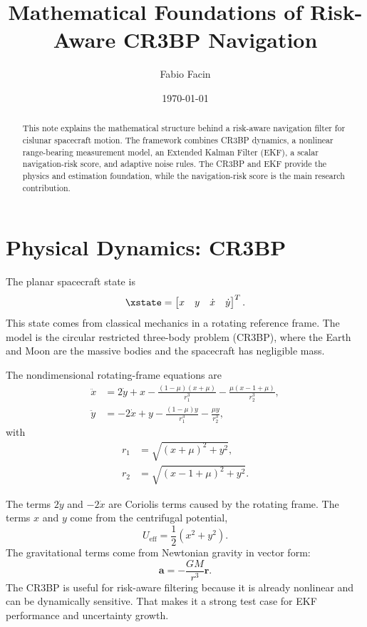 \documentclass[11pt]{article}
\title{Mathematical Foundations of Risk-Aware CR3BP Navigation}
\author{Fabio Facin}
\date{\today}
\begin{document}
\maketitle

\begin{abstract}
This note explains the mathematical structure behind a risk-aware navigation
filter for cislunar spacecraft motion. The framework combines CR3BP dynamics,
a nonlinear range-bearing measurement model, an Extended Kalman Filter (EKF),
a scalar navigation-risk score, and adaptive noise rules. The CR3BP and EKF
provide the physics and estimation foundation, while the navigation-risk score
is the main research contribution.
\end{abstract}

\section{Physical Dynamics: CR3BP}

The planar spacecraft state is
\begin{equation}
  \xstate =
  \begin{bmatrix}
    x & y & \dot{x} & \dot{y}
  \end{bmatrix}^{T}.
\end{equation}
This state comes from classical mechanics in a rotating reference frame. The
model is the circular restricted three-body problem (CR3BP), where the Earth
and Moon are the massive bodies and the spacecraft has negligible mass.

The nondimensional rotating-frame equations are
\begin{align}
  \ddot{x}
  &=
  2\dot{y}
  + x
  - \frac{(1-\mu)(x+\mu)}{r_1^3}
  - \frac{\mu(x-1+\mu)}{r_2^3},
  \\
  \ddot{y}
  &=
  -2\dot{x}
  + y
  - \frac{(1-\mu)y}{r_1^3}
  - \frac{\mu y}{r_2^3},
\end{align}
with
\begin{align}
  r_1 &= \sqrt{(x+\mu)^2+y^2},\\
  r_2 &= \sqrt{(x-1+\mu)^2+y^2}.
\end{align}

The terms $2\dot{y}$ and $-2\dot{x}$ are Coriolis terms caused by the rotating
frame. The terms $x$ and $y$ come from the centrifugal potential,
\begin{equation}
  U_{\mathrm{eff}} = \frac{1}{2}(x^2+y^2).
\end{equation}
The gravitational terms come from Newtonian gravity in vector form:
\begin{equation}
  \bm{a} = -\frac{GM}{r^3}\bm{r}.
\end{equation}
The CR3BP is useful for risk-aware filtering because it is already nonlinear
and can be dynamically sensitive. That makes it a strong test case for EKF
performance and uncertainty growth.
\end{document}
